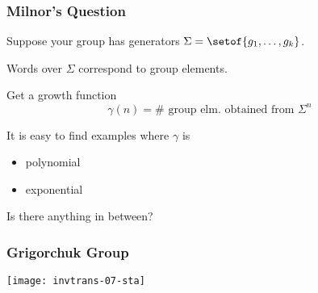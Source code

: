 \documentclass[handout,10pt]{ksbeamer}
\let\emph=\alert
\def\F#1{\underline{#1}}
\begin{document}
\begin{frame}
\frametitle{Milnor's Question}

Suppose your group has generators $\Sigma = \setof{g_{1},\ldots,g_{k}}$.
\vspace{2ex}

Words over $\Sigma$ correspond to group elements.
\vspace{2ex}

Get a \emph{growth function}
%
$$
      \gamma(n) = \# \text{ group elm. obtained from } \Sigma^{n}
$$
%
\vspace{2ex}

It is easy to find examples where $\gamma$ is
\begin{itemize}
\item   polynomial
\item   exponential 
\end{itemize}

Is there anything in between?

\end{frame}


\begin{frame}
\frametitle{Grigorchuk Group}

\begin{center}
\texttt{[image: invtrans-07-sta]}
\end{center}

\end{frame}










\end{document}
